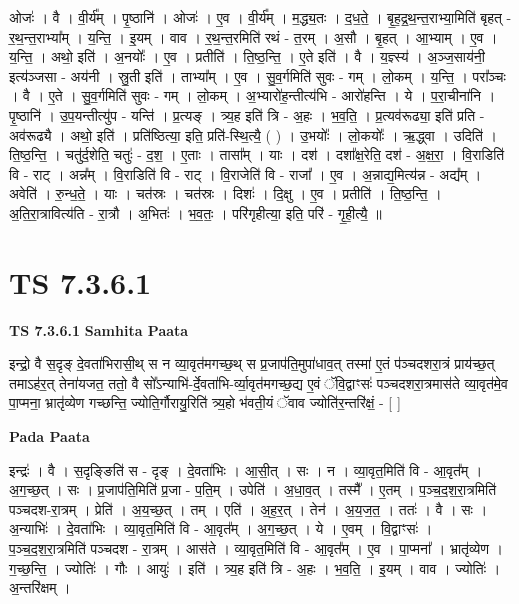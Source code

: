 \documentclass[17pt]{extarticle}
\begin{document}
ओजः॑ । वै । वी॒र्य᳚म् । पृ॒ष्ठानि॑ । ओजः॑ । ए॒व । वी॒र्य᳚म् । म॒द्ध्य॒तः । द॒ध॒ते॒ । बृ॒ह॒द्र॒थ॒न्त॒राभ्या॒मिति॑ बृहत् - र॒थ॒न्त॒राभ्या᳚म् । य॒न्ति॒ । इ॒यम् । वाव । र॒थ॒न्त॒रमिति॑ रथं - त॒रम् । अ॒सौ । बृ॒हत् । आ॒भ्याम् । ए॒व । य॒न्ति॒ । अथो॒ इति॑ । अ॒नयोः᳚ । ए॒व । प्रतीति॑ । ति॒ष्ठ॒न्ति॒ । ए॒ते इति॑ । वै । य॒ज्ञ्स्य॑ । अ॒ञ्ज॒साय॑नी॒ इत्य॑ञ्जसा - अय॑नी । स्रु॒ती इति॑ । ताभ्या᳚म् । ए॒व । सु॒व॒र्गमिति॑ सुवः - गम् । लो॒कम् । य॒न्ति॒ । परा᳚ञ्चः । वै । ए॒ते । सु॒व॒र्गमिति॑ सुवः - गम् । लो॒कम् । अ॒भ्यारो॑ह॒न्तीत्य॑भि - आरो॑हन्ति । ये । प॒रा॒चीना॑नि । पृ॒ष्ठानि॑ । उ॒प॒यन्तीत्यु॑प - यन्ति॑ । प्र॒त्यङ् । त्र्य॒ह इति॑ त्रि - अ॒हः । भ॒व॒ति॒ । प्र॒त्यव॑रूढ्या॒ इति॑ प्रति - अव॑रूढ्यै । अथो॒ इति॑ । प्रति॑ष्ठित्या॒ इति॒ प्रति॑-स्थि॒त्यै॒ ( ) । उ॒भयोः᳚ । लो॒कयोः᳚ । ऋ॒द्ध्वा । उदिति॑ । ति॒ष्ठ॒न्ति॒ । चतु॑र्द॒शेति॒ चतुः॑ - द॒श॒ । ए॒ताः । तासा᳚म् । याः । दश॑ । दशा᳚क्ष॒रेति॒ दश॑ - अ॒क्ष॒रा॒ । वि॒राडिति॑ वि - राट् । अन्न᳚म् । वि॒राडिति॑ वि - राट् । वि॒राजेति॑ वि - राजा᳚ । ए॒व । अ॒न्नाद्य॒मित्य॑न्न - अद्य᳚म् । अवेति॑ । रु॒न्ध॒ते॒ । याः । चत॑स्रः । चत॑स्रः । दिशः॑ । दि॒क्षु । ए॒व । प्रतीति॑ । ति॒ष्ठ॒न्ति॒ । अ॒ति॒रा॒त्रावित्य॑ति - रा॒त्रौ । अ॒भितः॑ । भ॒व॒तः॒ । परि॑गृहीत्या॒ इति॒ परि॑ - गृ॒ही॒त्यै॒ ॥  \newline





\section{ TS 7.3.6.1 }

\textbf{TS 7.3.6.1 } \newline
\textbf{Samhita Paata} \newline

इन्द्रो॒ वै स॒दृङ् दे॒वता॑भिरासी॒थ् स न व्या॒वृत॑मगच्छ॒थ् स प्र॒जाप॑ति॒मुपा॑धाव॒त् तस्मा॑ ए॒तं प॑ञ्चदशरा॒त्रं प्राय॑च्छ॒त् तमाऽह॑र॒त् तेना॑यजत॒ ततो॒ वै सो᳚ऽन्याभि॑-र्दे॒वता॑भि-र्व्या॒वृत॑मगच्छ॒द्य ए॒वं ॅवि॒द्वाꣳसः॑ पञ्चदशरा॒त्रमास॑ते व्या॒वृत॑मे॒व पा॒प्मना॒ भ्रातृ॑व्येण गच्छन्ति॒ ज्योति॒र्गौरायु॒रिति॑ त्र्य॒हो भ॑वती॒यं ॅवाव ज्योति॑र॒न्तरि॑क्षं॒ - [  ] \newline

\textbf{Pada Paata} \newline

इन्द्रः॑ । वै । स॒दृङ्ङिति॑ स - दृङ् । दे॒वता॑भिः । आ॒सी॒त् । सः । न । व्या॒वृत॒मिति॑ वि - आ॒वृत᳚म् । अ॒ग॒च्छ॒त् । सः । प्र॒जाप॑ति॒मिति॑ प्र॒जा - प॒ति॒म् । उपेति॑ । अ॒धा॒व॒त् । तस्मै᳚ । ए॒तम् । प॒ञ्च॒द॒श॒रा॒त्रमिति॑ पञ्चदश-रा॒त्रम् । प्रेति॑ । अ॒य॒च्छ॒त् । तम् । एति॑ । अ॒ह॒र॒त् । तेन॑ । अ॒य॒ज॒त॒ । ततः॑ । वै । सः । अ॒न्याभिः॑ । दे॒वता॑भिः । व्या॒वृत॒मिति॑ वि - आ॒वृत᳚म् । अ॒ग॒च्छ॒त् । ये । ए॒वम् । वि॒द्वाꣳसः॑ । प॒ञ्च॒द॒श॒रा॒त्रमिति॑ पञ्चदश - रा॒त्रम् । आस॑ते । व्या॒वृत॒मिति॑ वि - आ॒वृत᳚म् । ए॒व । पा॒प्मना᳚ । भ्रातृ॑व्येण । ग॒च्छ॒न्ति॒ । ज्योतिः॑ । गौः । आयुः॑ । इति॑ । त्र्य॒ह इति॑ त्रि - अ॒हः । भ॒व॒ति॒ । इ॒यम् । वाव । ज्योतिः॑ । अ॒न्तरि॑क्षम् ।  \newline
\end{document}
